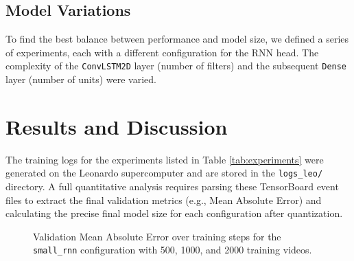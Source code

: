 \documentclass{article}
\begin{document}
\subsection{Model Variations}
To find the best balance between performance and model size, we defined a series of experiments, each with a different configuration for the RNN head. The complexity of the \texttt{ConvLSTM2D} layer (number of filters) and the subsequent \texttt{Dense} layer (number of units) were varied. 

\section{Results and Discussion}
The training logs for the experiments listed in Table \ref{tab:experiments} were generated on the Leonardo supercomputer and are stored in the \texttt{logs\_leo/} directory. A full quantitative analysis requires parsing these TensorBoard event files to extract the final validation metrics (e.g., Mean Absolute Error) and calculating the precise final model size for each configuration after quantization.

\begin{figure}[h!]
\centering
{}
\caption{Validation Mean Absolute Error over training steps for the \texttt{small\_rnn} configuration with 500, 1000, and 2000 training videos.}
\label{fig:validation_mae_small_rnn}
\end{figure}
\end{document}
